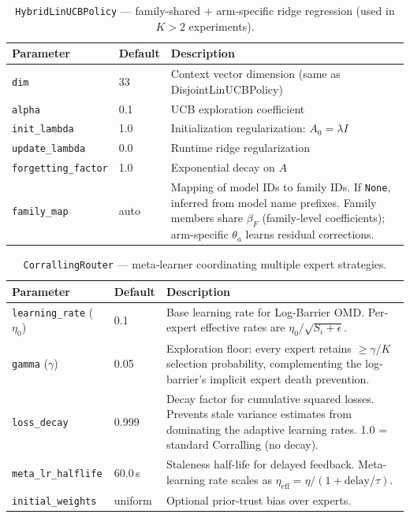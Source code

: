 
\begin{table}[h]
\centering
\caption{\texttt{HybridLinUCBPolicy} --- family-shared + arm-specific ridge regression (used in $K{>}2$ experiments).}
\label{tab:hybrid_library}
\small
\begin{tabular}{@{}llp{6.8cm}@{}}
\toprule
\textbf{Parameter} & \textbf{Default} & \textbf{Description} \\
\midrule
\texttt{dim} & 33 & Context vector dimension (same as DisjointLinUCBPolicy) \\
\texttt{alpha} & 0.1 & UCB exploration coefficient \\
\texttt{init\_lambda} & 1.0 & Initialization regularization: $A_0 = \lambda I$ \\
\texttt{update\_lambda} & 0.0 & Runtime ridge regularization \\
\texttt{forgetting\_factor} & 1.0 & Exponential decay on $A$ \\
\texttt{family\_map} & auto & Mapping of model IDs to family IDs. If \texttt{None}, inferred from model name prefixes. Family members share $\beta_F$ (family-level coefficients); arm-specific $\theta_a$ learns residual corrections. \\
\bottomrule
\end{tabular}
\end{table}


\begin{table}[h]
\centering
\caption{\texttt{CorrallingRouter} --- meta-learner coordinating multiple expert strategies.}
\label{tab:corralling_library}
\small
\begin{tabular}{@{}llp{6.8cm}@{}}
\toprule
\textbf{Parameter} & \textbf{Default} & \textbf{Description} \\
\midrule
\texttt{learning\_rate} ($\eta_0$) & 0.1 & Base learning rate for Log-Barrier OMD. Per-expert effective rates are $\eta_0 / \sqrt{S_i + \epsilon}$. \\
\texttt{gamma} ($\gamma$) & 0.05 & Exploration floor: every expert retains $\geq \gamma/K$ selection probability, complementing the log-barrier's implicit expert death prevention. \\
\texttt{loss\_decay} & 0.999 & Decay factor for cumulative squared losses. Prevents stale variance estimates from dominating the adaptive learning rates. 1.0 = standard Corralling (no decay). \\
\texttt{meta\_lr\_halflife} & 60.0\,s & Staleness half-life for delayed feedback. Meta-learning rate scales as $\eta_{\text{eff}} = \eta / (1 + \text{delay}/\tau)$. \\
\texttt{initial\_weights} & uniform & Optional prior-trust bias over experts. \\
\bottomrule
\end{tabular}
\end{table}

